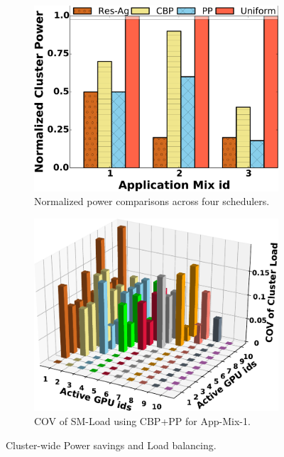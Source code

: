 \begin{figure}[tbp!]
\begin{subfigure}[b]{.234\textwidth}
\centering
  \includegraphics[width=.99\linewidth]{results/power.pdf}
  \caption{Normalized power comparisons across four schedulers.}
  \label{fig:power}
\end{subfigure}
\begin{subfigure}[b]{.234\textwidth}
\centering
  \includegraphics[width=.99\linewidth]{results/active3d.pdf}
  \caption{COV of SM-Load using CBP+PP for App-Mix-1.}
  \label{fig:load}
\end{subfigure}
\vspace{-2mm}
\caption{Cluster-wide Power savings and Load balancing.}
\label{fig:powandload}
\end{figure}



